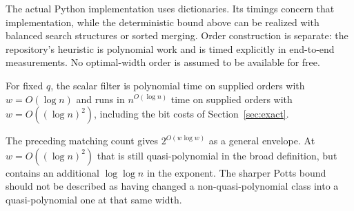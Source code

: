 The actual Python implementation uses dictionaries. Its timings concern
that implementation, while the deterministic bound above can be realized
with balanced search structures or sorted merging. Order construction is
separate: the repository's heuristic is polynomial work and is timed
explicitly in end-to-end measurements. No optimal-width order is assumed
to be available for free.

\begin{corollary}\label{cor:widthclasses}
For fixed $q$, the scalar filter is polynomial time on supplied orders with
$w=O(\log n)$ and runs in $n^{O(\log n)}$ time on supplied orders with
$w=O((\log n)^2)$, including the bit costs of Section~\ref{sec:exact}.
\end{corollary}
The preceding matching count gives $2^{O(w\log w)}$ as a general envelope.
At $w=O((\log n)^2)$ that is still quasi-polynomial in the broad definition,
but contains an additional $\log\log n$ in the exponent.
The sharper Potts bound should not be described as having changed a
non-quasi-polynomial class into a quasi-polynomial one at that same width.
